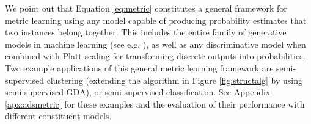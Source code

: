 We point out that Equation \ref{eq:metric} constitutes a general framework for metric learning using any model capable of producing probability estimates that two instances belong together. This includes the entire family of generative models in machine learning (see e.g. \citep{bishop2006pattern}), as well as any discriminative model when combined with Platt scaling \citep{platt1999probabilistic} for transforming discrete outputs into probabilities. Two example applications of this general metric learning framework are semi-supervised clustering (extending the algorithm in Figure \ref{fig:structalg} by using semi-supervised GDA), or semi-supervised classification. See Appendix \ref{apx:adsmetric} for these examples and the evaluation of their performance with different constituent models.








%
%
%
%
%
